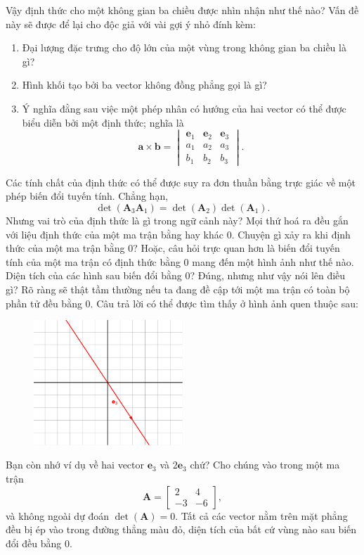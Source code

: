 Vậy định thức cho một không gian ba chiều được nhìn nhận như thế nào? Vấn đề này sẽ được để lại cho độc giả với vài gợi ý nhỏ đính kèm:
\begin{enumerate}
    \item Đại lượng đặc trưng cho độ lớn của một vùng trong không gian ba chiều là gì?
    \item Hình khối tạo bởi ba vector không đồng phẳng gọi là gì?
    \item Ý nghĩa đằng sau việc một phép nhân có hướng của hai vector có thể được biểu diễn bởi một định thức; nghĩa là
    \[\mathbf{a}\times \mathbf{b}=\begin{vmatrix}
        \mathbf{e}_1 &\mathbf{e}_2 &\mathbf{e}_3\\
        a_1 & a_2 & a_3 \\
        b_1 & b_2 &b_3
    \end{vmatrix}.\]
\end{enumerate}
Các tính chất của định thức có thể được suy ra đơn thuần bằng trực giác về một phép biến đổi tuyến tính. Chẳng hạn,
\[\det(\mathbf{A}_3 \mathbf{A}_1)=\det(\mathbf{A}_2)\det(\mathbf{A}_1).\]
Nhưng vai trò của định thức là gì trong ngữ cảnh này? Mọi thứ hoá ra đều gắn với liệu định thức của một ma trận bằng hay khác 0.
Chuyện gì xảy ra khi định thức của một ma trận bằng 0? Hoặc, câu hỏi trực quan hơn là biến đổi tuyến tính của một ma trận có định thức bằng 0 mang đến một hình ảnh như thế nào. Diện tích của các hình sau biến đổi bằng 0? Đúng, nhưng 
như vậy nói lên điều gì? Rõ ràng sẽ thật tầm thường nếu ta đang đề cập tới một ma trận có toàn bộ phần tử đều bằng 0. Câu trả lời có thể được tìm thấy ở hình ảnh quen thuộc sau:
\begin{figure}[H]
    \centering
    \includegraphics[width=0.5\textwidth]{Tuan2/Figures/avectoronaline.png}
\end{figure} 
Bạn còn nhớ ví dụ về hai vector \(\mathbf{e}_3\) và \(2\mathbf{e}_3\) chứ? Cho chúng vào trong một ma trận
\[\mathbf{A}=\begin{bmatrix}
    2&4\\
    -3&-6
\end{bmatrix},\] và không ngoài dự đoán \(\det(\mathbf{A})=0.\) Tất cả các vector nằm trên mặt phẳng đều bị ép vào trong đường thẳng màu đỏ, diện tích của bất cứ vùng nào sau biến đổi đều bằng 0.
